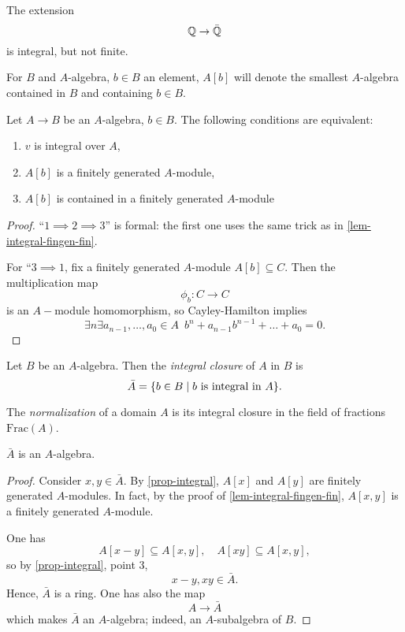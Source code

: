 \begin{example}
  The extension
  \[ \mathbb Q \to \bar {\mathbb Q}\]
  is integral, but not finite.
\end{example}

\begin{df}
  For $B$ and $A$-algebra, $b \in B$ an element, $A[b]$ will denote the smallest $A$-algebra contained in $B$ and containing $b \in B$.
\end{df}

\begin{prop}
  \label{prop-integral}
  Let $A \to B$ be an $A$-algebra, $b \in B$. The following conditions are equivalent:
  \begin{enumerate}
  \item $v$ is integral over $A$,
  \item $A[b]$ is a finitely generated $A$-module,
  \item $A[b]$ is contained in a finitely generated $A$-module
  \end{enumerate}
\end{prop}
\begin{proof}
  ``$1 \implies 2 \implies 3$'' is formal: the first one uses the same trick as in \cref{lem-integral-fingen-fin}.

  For ``$ 3 \implies 1$, fix a finitely generated $A$-module $A[b] \subseteq C$. Then the multiplication map
  \[ \phi_b \colon C \to C\]
  is an $A-$module homomorphism, so Cayley-Hamilton implies
  \[ \exists n \exists a_{n-1}, \dotsc, a_0 \in A \enspace b^n + a_{n-1} b^{n-1} + \dotso + a_0 = 0.\]
\end{proof}

\begin{df}
  Let $B$ be an $A$-algebra. Then the \textit{integral closure} of $A$ in $B$ is
  \[ \bar A = \{ b \in B \mathrel{|} \text{$b$ is integral in $A$}\}.\]

  The \textit{normalization} of a domain $A$ is its integral closure in the field of fractions $\text{Frac}(A)$.
\end{df}


\begin{corollary}
  $\bar A$ is an $A$-algebra.
\end{corollary}
\begin{proof}
  Consider $x, y \in \bar A$. By \cref{prop-integral}, $A[x]$ and $A[y]$ are finitely generated $A$-modules. In fact, by the proof of \cref{lem-integral-fingen-fin}, $A[x, y]$ is a finitely generated $A$-module.

  One has
  \[ A[x - y] \subseteq A[x,y], \quad A[xy] \subseteq A[x, y],\]
  so by \cref{prop-integral}, point 3,
  \[ x- y, xy \in \bar A.\]
  Hence, $\bar A$ is a ring. One has also the map
  \[ A \to \bar A\]
  which makes $\bar A$ an $A$-algebra; indeed, an $A$-subalgebra of $B$.
\end{proof}

